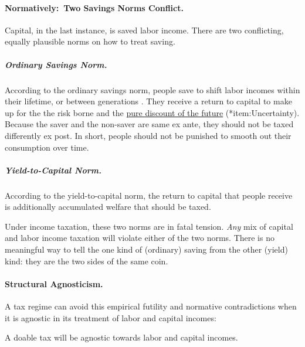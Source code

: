\paragraph{Normatively:~Two Savings Norms Conflict.}
	\label{sec:TwoSavingsNorms}
Capital, in the last instance, is saved labor income.
There are two conflicting, equally plausible norms on how to treat saving.

\subparagraph{Ordinary Savings Norm.}
	\label{sec:OSN}
According to the ordinary savings norm, people save to shift labor incomes within their lifetime, or between generations \citep[819]{McCaffery2005}.
They receive a return to capital to make up for the the risk borne and the \hyperref[item:Uncertainty]{pure discount of the future} (*{item:Uncertainty}).
Because the saver and the non-saver are same ex ante, they should not be taxed differently ex post.
In short, people should not be punished to smooth out their consumption over time.

\subparagraph{Yield-to-Capital Norm.}
	\label{sec:Y2C}
According to the yield-to-capital norm, the return to capital that people receive is additionally accumulated welfare that should be taxed.

Under income taxation, these two norms are in fatal tension.
\emph{Any} mix of capital and labor income taxation will violate either of the two norms.
There is no meaningful way to tell the one kind of (ordinary) saving from the other (yield) kind:
they are the two sides of the same coin.


\paragraph{Structural Agnosticism.}
A tax regime can avoid this empirical futility and normative contradictions when it is agnostic in its treatment of labor and capital incomes:

\begin{desideratum}
	\label{des:structural-agnosticism}
	A doable tax will be agnostic towards labor and capital incomes.
\end{desideratum}

